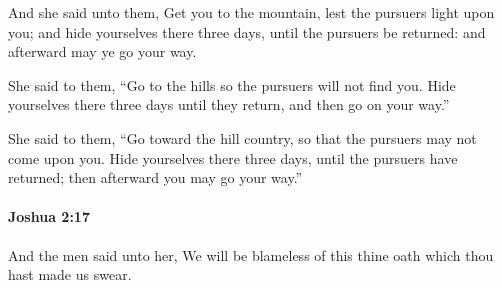 			\begin{versebox}
					\item[BHS] 
					\item[ASV] And she said unto them, Get you to the mountain, lest the pursuers light upon you; and hide yourselves there three days, until the pursuers be returned: and afterward may ye go your way.
					\item[NIV] She said to them, “Go to the hills so the pursuers will not find you. Hide yourselves there three days until they return, and then go on your way.”
					\item[NRSV] She said to them, “Go toward the hill country, so that the pursuers may not come upon you. Hide yourselves there three days, until the pursuers have returned; then afterward you may go your way.”
			\end{versebox}

		\paragraph{Joshua 2:17} %
			\label{JOSHUA-2-17}

			And the men said unto her, We will be blameless of this thine oath which thou hast made us swear.

